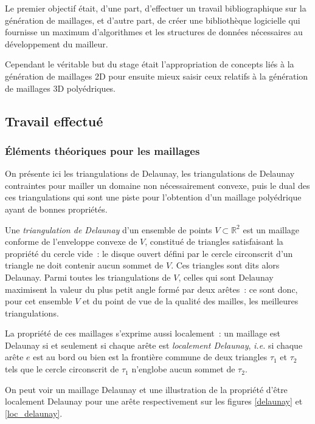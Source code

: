 \documentclass[12pt,a4paper]{report}
\begin{document}
Le premier objectif était, d'une part, d'effectuer un travail bibliographique sur la génération de maillages, et d'autre part, de créer une bibliothèque logicielle qui fournisse un maximum d'algorithmes et les structures de données nécessaires au développement du mailleur.

Cependant le véritable but du stage était l'appropriation de concepts liés à la génération de maillages 2D pour ensuite mieux saisir ceux relatifs à la génération de maillages 3D polyédriques.

\subsection{Travail effectué}

\subsubsection{\'Eléments théoriques pour les maillages}

On présente ici les triangulations de Delaunay, les triangulations de Delaunay contraintes pour mailler un domaine non nécessairement convexe, puis le dual des ces triangulations qui sont une piste pour l'obtention d'un maillage polyédrique ayant de bonnes propriétés.
\vspace{1cm}

Une \emph{triangulation de Delaunay} d'un ensemble de points $V\subset\mathbb{R}^2$ est un maillage conforme de l'enveloppe convexe de $V$, constitué de triangles satisfaisant la propriété du cercle vide~: le disque ouvert défini par le cercle circonscrit d'un triangle ne doit contenir aucun sommet de $V$. Ces triangles sont dits alors Delaunay. Parmi toutes les triangulations de $V$, celles qui sont Delaunay maximisent la valeur du plus petit angle formé par deux arêtes~: ce sont donc, pour cet ensemble $V$ et du point de vue de la qualité des mailles, les \og meilleures \fg{} triangulations.

La propriété de ces maillages s'exprime aussi localement~: un maillage est Delaunay si et seulement si chaque arête est \emph{localement Delaunay}, \emph{i.e.} si chaque arête $e$ est au bord ou bien est la frontière commune de deux triangles $\tau_1$ et $\tau_2$ tels que le cercle circonscrit de $\tau_1$ n'englobe aucun sommet de $\tau_2$.

On peut voir un maillage Delaunay et une illustration de la propriété d'être localement Delaunay pour une arête respectivement sur les figures \ref{delaunay} et \ref{loc_delaunay}.
\end{document}

